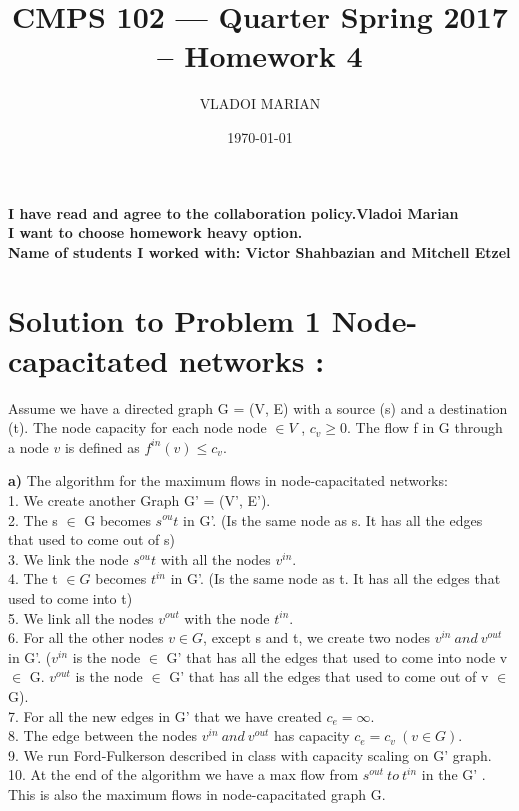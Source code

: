 \documentclass[11 pt]{article}
\title{ CMPS 102 --- Quarter  Spring 2017 --  Homework 4}
\author{VLADOI MARIAN}
\date{\today}
\begin{document}
\maketitle

\begin{center}
{\bf I have read and agree to the collaboration policy.Vladoi Marian}\\
{\bf I want to choose homework heavy option.}\\
{\bf Name of students I worked with: Victor Shahbazian and Mitchell Etzel }
\end{center}


\section*{Solution to Problem 1 Node-capacitated networks : }

Assume we have a directed graph G = (V, E) with a source (s) and a destination (t). The node capacity for each node node $\in V $ , $c_v \geq 0$. The flow f in G through a node  $v$ is defined as $f^{in}(v) \leq  c_v$.

\textbf{a)} The algorithm  for the maximum flows in node-capacitated networks:\\

1. We create another Graph G' = (V', E').\\
2. The s $\in $ G becomes $s^{ou}t $ in G'. (Is the same node as s. It has all the edges that used to come out of s)\\
3. We link the node $s^{ou}t $ with all the nodes $v^{in}$. \\
4. The t $\in G$ becomes $t^{in}$ in G'. (Is the same node as t. It has all the edges that used to come into t)\\
5.  We link all the nodes $v^{out}$ with the node  $t^{in}$. \\
6. For all the other nodes $v \in G$, except s and t, we create two nodes $v^{in} \ and \  v^{out}$ in G'. ($v^{in} $ is the node $\in$ G' that has all the edges that used to come into node v $\in $ G. $v^{out}$ is 
the node $\in $ G' that has all the edges that used to come out of v $\in$ G).\\
7. For all the new edges in G' that we have created $c_e= \infty$.\\
8. The edge between the nodes $v^{in} \  and \ v^{out} $ has capacity $c_e = c_v  \ (v \in G)$. \\ 
9. We run Ford-Fulkerson described in class with capacity scaling on G' graph. \\
10. At the end of the algorithm we have a max flow from $ s^{out} \ to \ t^{in}$ in the G' . This is also the maximum flows in node-capacitated graph G.
\end{document}

